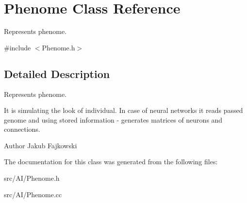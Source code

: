 \hypertarget{classPhenome}{}\section{Phenome Class Reference}
\label{classPhenome}


Represents phenome.  




{\ttfamily \#include $<$Phenome.\+h$>$}



\subsection{Detailed Description}
Represents phenome. 

It is simulating the look of individual. In case of neural networks it reads passed genome and using stored information -\/ generates matrices of neurons and connections. \begin{DoxyAuthor}{Author}
Jakub Fajkowski 
\end{DoxyAuthor}


The documentation for this class was generated from the following files\+:\begin{DoxyCompactItemize}
\item 
src/\+A\+I/Phenome.\+h\item 
src/\+A\+I/Phenome.\+cc\end{DoxyCompactItemize}
